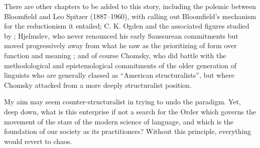 \documentclass[output=paper]{langscibook}
\begin{document}
There are other chapters to be added to this story, including the polemic between Bloomfield and Leo Spitzer (1887--1960), with \citet{Spitzer1944} calling out Bloomfield's mechanism for the reductionism it entailed; C. K. Ogden and the associated figures studied by \citet{McElvenny2018}; Hjelmslev, who never renounced his early Saussurean commitments but moved progressively away from what he saw as the prioritizing of form over function and meaning \citep{Joseph2018hj}; and of course Chomsky, who did battle with the methodological and epistemological commitments of the older generation of linguists who are generally classed as ``American structuralists'', but where Chomsky attacked from a more deeply structuralist position.

My aim may seem counter-structuralist in trying to undo the paradigm. Yet, deep down, what is this enterprise if not a search for the Order which governs the movement of the stars of the modern science of language, and which is the foundation of our society as its practitioners? Without this principle, everything would revert to chaos.

\sloppy
\printbibliography[heading=subbibliography,notkeyword=this]
\end{document}
